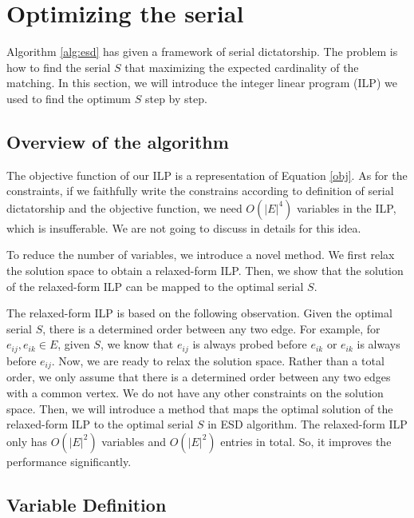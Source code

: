 \documentclass[letterpaper]{article}
\begin{document}
\section{Optimizing the serial}

Algorithm \ref{alg:esd} has given a framework of serial dictatorship. 
The problem is how to find the serial  $S$ that maximizing the expected cardinality of the matching.
In this section, we will introduce the integer linear program (ILP) we used to find the optimum $S$ step by step.

\subsection{Overview of the algorithm}

The objective function of our ILP is a representation of Equation \ref{obj}.
As for the constraints, if we faithfully write the constrains according to definition of serial dictatorship and the objective function, we need $O(|E|^4)$ variables in the ILP, which is insufferable. We are not going to discuss in details for this idea.

To reduce the number of variables, we introduce a novel method.
We first relax the solution space to obtain a relaxed-form ILP.
Then, we show that the solution of the relaxed-form ILP can be mapped to the optimal serial $S$.

The relaxed-form ILP is based on the following observation.
Given the optimal serial $S$, there is a determined order between any two edge.
For example, for $e_{ij}, e_{ik}\in E$, given $S$, we know that $e_{ij}$ is always probed before $e_{ik}$ or $e_{ik}$ is always before $e_{ij}$.
Now, we are ready to relax the solution space.
Rather than a total order, we only assume that there is a determined order between any two edges with a common vertex.
We do not have any other constraints on the solution space.
Then, we will introduce a method that maps the optimal solution of the relaxed-form ILP to the optimal serial $S$ in ESD algorithm.
The relaxed-form ILP only has $O(|E|^2)$ variables and $O(|E|^2)$ entries in total.
So, it improves the performance significantly.

\subsection{Variable Definition}
\end{document}

